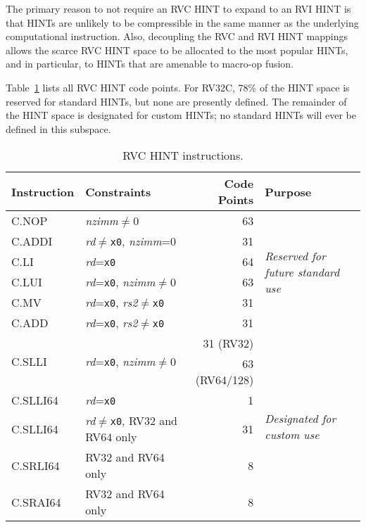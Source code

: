 \begin{commentary}
The primary reason to not require an RVC HINT to expand to an RVI HINT
is that HINTs are unlikely to be compressible in the same manner as
the underlying computational instruction.  Also, decoupling the RVC
and RVI HINT mappings allows the scarce RVC HINT space to be allocated
to the most popular HINTs, and in particular, to HINTs that are
amenable to macro-op fusion.
\end{commentary}

Table~\ref{tab:rvc-hints} lists all RVC HINT code points.  For RV32C, 78\% of
the HINT space is reserved for standard HINTs, but none are presently defined.
The remainder of the HINT space is designated for custom HINTs; no standard
HINTs will ever be defined in this subspace.

\begin{table}[hbt]
\centering
\begin{tabular}{|l|l|r|l|}
  \hline
  Instruction             & Constraints                                 & Code Points & Purpose \\ \hline \hline
  C.NOP                   & {\em nzimm}$\neq$0                          & 63          & \multirow{6}{*}{\em Reserved for future standard use} \\ \cline{1-3}
  C.ADDI                  & {\em rd}$\neq${\tt x0}, {\em nzimm}=0       & 31          & \\ \cline{1-3}
  C.LI                    & {\em rd}={\tt x0}                           & 64          & \\ \cline{1-3}
  C.LUI                   & {\em rd}={\tt x0}, {\em nzimm}$\neq$0       & 63          & \\ \cline{1-3}
  C.MV                    & {\em rd}={\tt x0}, {\em rs2}$\neq${\tt x0}  & 31          & \\ \cline{1-3}
  C.ADD                   & {\em rd}={\tt x0}, {\em rs2}$\neq${\tt x0}  & 31          & \\ \hline \hline
  \multirow{2}{*}{C.SLLI} & \multirow{2}{*}{{\em rd}={\tt x0}, {\em nzimm}$\neq$0} & 31 (RV32)   & \multirow{6}{*}{\em Designated for custom use} \\
                          &                                             & 63 (RV64/128) & \\ \cline{1-3}
  C.SLLI64                & {\em rd}={\tt x0}                           & 1           & \\ \cline{1-3}
  C.SLLI64                & {\em rd}$\neq${\tt x0}, RV32 and RV64 only  & 31          & \\ \cline{1-3}
  C.SRLI64                & RV32 and RV64 only                          & 8           & \\ \cline{1-3}
  C.SRAI64                & RV32 and RV64 only                          & 8           & \\ \hline
\end{tabular}
\caption{RVC HINT instructions.}
\label{tab:rvc-hints}
\end{table}

